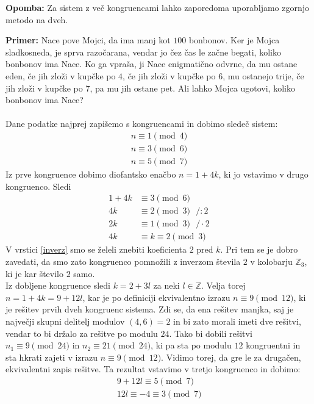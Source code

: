 \documentclass[12pt, a4paper]{article}
\newenvironment{prim}[1][]{\par\medskip\noindent \textbf{Primer: }}{\medskip}
\newenvironment{opom}[1][]{\par\medskip\noindent \textbf{Opomba: }}{\medskip}
\begin{document}
\begin{opom}
Za sistem z več kongruencami lahko zaporedoma uporabljamo zgornjo metodo na dveh.
\end{opom}

\begin{prim}
Nace pove Mojci, da ima manj kot $100$ bonbonov. Ker je Mojca sladkosneda, je sprva razočarana, vendar jo čez čas le začne begati, koliko bonbonov ima Nace. Ko ga vpraša, ji Nace enigmatično odvrne, da mu ostane eden, če jih zloži v kupčke po $4$, če jih zloži v kupčke po $6$, mu ostanejo trije, če jih zloži v kupčke po $7$, pa mu jih ostane pet. Ali lahko Mojca ugotovi, koliko bonbonov ima Nace? 
\\
\\
Dane podatke najprej zapišemo s kongruencami in dobimo sledeč sistem:
\begin{gather*}
n\equiv 1 \pmod 4 \\
n\equiv 3 \pmod 6 \\
n\equiv 5 \pmod 7
\end{gather*}
Iz prve kongruence dobimo diofantsko enačbo $n=1+4k$, ki jo vstavimo v drugo kongruenco. Sledi
\begin{align*}
1+4k&\equiv 3 \pmod 6 \\
4k&\equiv 2 \pmod 3 \ \ \ /:2 \\
2k&\equiv 1 \pmod 3 \ \ \  /\cdot 2 \tag{$\ast$}\label{inverz}\\
4k&\equiv k\equiv 2 \pmod 3
\end{align*}
V vrstici \eqref{inverz} smo se želeli znebiti koeficienta $2$ pred $k$. Pri tem se je dobro zavedati, da smo zato kongruenco pomnožili z inverzom števila $2$ v kolobarju $\mathbb{Z}_{3}$, ki je kar število $2$ samo. \\
Iz dobljene kongruence sledi $k=2+3l$ za neki $l\in \mathbb{Z}$. Velja torej $ n=1+4k=9+12l$, kar je po definiciji ekvivalentno izrazu $n\equiv9 \pmod{12}$, ki je rešitev prvih dveh kongruenc sistema. Zdi se, da ena rešitev manjka, saj je največji skupni delitelj modulov $(4,6)=2$ in bi zato morali imeti dve rešitvi, vendar to bi držalo za rešitve po modulu $24$. Tako bi dobili rešitvi $n_{1}\equiv 9 \pmod{24}$ in $n_{2}\equiv 21 \pmod{24}$, ki pa sta po modulu $12$ kongruentni in sta hkrati zajeti v izrazu $n\equiv9 \pmod{12}$. Vidimo torej, da gre le za drugačen, ekvivalentni zapis rešitve.
Ta rezultat vstavimo v tretjo kongruenco in dobimo:
\begin{gather*}
9+12l\equiv 5 \pmod 7 \\
12l\equiv -4 \equiv 3 \pmod 7 
\end{gather*}


\end{prim}
\end{document}
